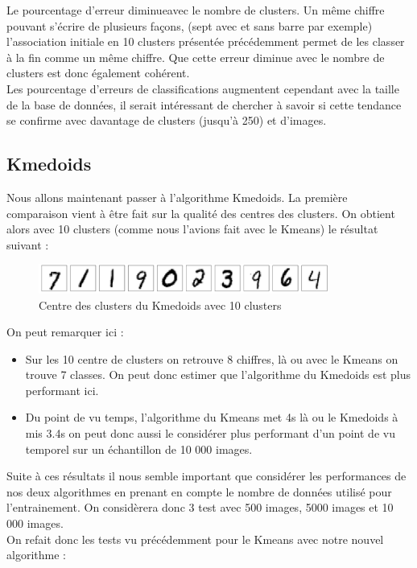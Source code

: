 \documentclass{article}
\begin{document}
Le pourcentage d'erreur diminueavec le nombre de clusters. Un même chiffre pouvant s'écrire de plusieurs façons, (sept avec et sans barre par exemple) l'association initiale en 10 clusters présentée précédemment permet de les classer à la fin comme un même chiffre. Que cette erreur diminue avec le nombre de clusters est donc également cohérent.\\
Les pourcentage d'erreurs de classifications augmentent cependant avec la taille de la base de données, il serait intéressant de chercher à savoir si cette tendance se confirme avec davantage de clusters (jusqu'à 250) et d'images.

\subsection{Kmedoids}

Nous allons maintenant passer à l'algorithme Kmedoids. La première comparaison vient à être fait sur la qualité des centres des clusters. On obtient alors avec 10 clusters (comme nous l'avions fait avec le Kmeans) le résultat suivant :
\begin{figure}[H]
	\centering
	\includegraphics[width=0.85\textwidth]{"./Images/kmc.png"}
	\caption{\centering Centre des clusters du Kmedoids avec 10 clusters}
\end{figure}

On peut remarquer ici :
\begin{itemize}
	\item Sur les 10 centre de clusters on retrouve 8 chiffres, là ou avec le Kmeans on trouve 7 classes. On peut donc estimer que l'algorithme du Kmedoids est plus performant ici.
	\item Du point de vu temps, l'algorithme du Kmeans met 4s là ou le Kmedoids à mis 3.4s on peut donc aussi le considérer plus performant d'un point de vu temporel sur un échantillon de 10 000 images.
\end{itemize}

Suite à ces résultats il nous semble important que considérer les performances de nos deux algorithmes en prenant en compte le nombre de données utilisé pour l'entrainement. On considèrera donc 3 test avec 500 images, 5000 images et 10 000 images. \\

On refait donc les tests vu précédemment pour le Kmeans avec notre nouvel algorithme :
\end{document}
